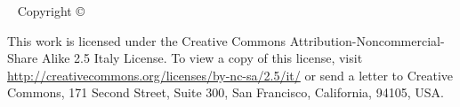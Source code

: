 \newpage
\begin{fullwidth}
~\vfill
\thispagestyle{empty}
\setlength{\parindent}{0pt}
\setlength{\parskip}{\baselineskip}
Copyright \copyright\ \the\year\ \thanklessauthor

\par{}

\par This work is licensed under the Creative Commons Attribution-Noncommercial-Share Alike 2.5 Italy License. To view a copy of this license, visit \url{http://creativecommons.org/licenses/by-nc-sa/2.5/it/} or send a letter to Creative Commons, 171 Second Street, Suite 300, San Francisco, California, 94105, USA.

\end{fullwidth}